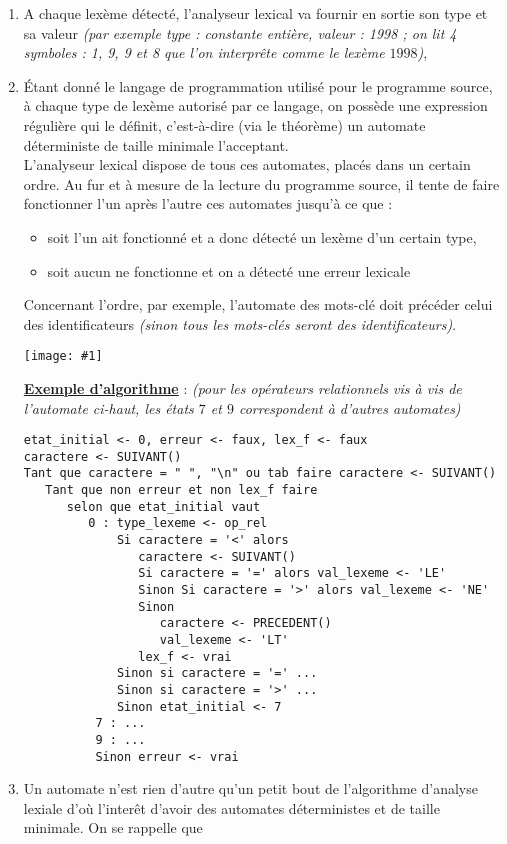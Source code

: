 \documentclass{article}
\newcommand{\imag}[1]{\begin{center}\texttt{[image: \#1]}\end{center}}
\newcommand{\stitre}[1]{\noindent\textbf{\underline{#1}}}
\begin{document}
\begin{enumerate}
\item A chaque lexème détecté, l'analyseur lexical va fournir en sortie son type et sa valeur \textit{(par exemple type : constante entière, valeur : 1998 ; on lit 4 symboles : 1, 9, 9
et 8 que l'on interprête comme le lexème $1998$)},
\item Étant donné le langage de programmation utilisé pour le programme source, à chaque type de lexème autorisé par ce langage, on possède une expression régulière qui le 
définit, c'est-à-dire (via le théorème) un automate déterministe de taille minimale l'acceptant. \\
L'analyseur lexical dispose de tous ces automates, placés dans un certain ordre. Au fur et à mesure de la lecture du programme source, il tente de faire fonctionner l'un 
après l'autre ces automates jusqu'à ce que : 
\begin{itemize}
\item soit l'un ait fonctionné et a donc détecté un lexème d'un certain type,
\item soit aucun ne fonctionne et on a détecté  une erreur lexicale
\end{itemize}
Concernant l'ordre, par exemple, l'automate des mots-clé doit précéder celui des identificateurs \textit{(sinon tous les mots-clés seront des identificateurs)}. \\
\imag{comp3.png}
\newpage
\stitre{Exemple d'algorithme} : \textit{(pour les opérateurs relationnels vis à vis de l'automate ci-haut, les états $7$ et $9$ correspondent à d'autres automates)}
\begin{verbatim}
etat_initial <- 0, erreur <- faux, lex_f <- faux
caractere <- SUIVANT()
Tant que caractere = " ", "\n" ou tab faire caractere <- SUIVANT()
   Tant que non erreur et non lex_f faire
      selon que etat_initial vaut
         0 : type_lexeme <- op_rel
             Si caractere = '<' alors
                caractere <- SUIVANT()
                Si caractere = '=' alors val_lexeme <- 'LE'
                Sinon Si caractere = '>' alors val_lexeme <- 'NE'
                Sinon
                   caractere <- PRECEDENT()
                   val_lexeme <- 'LT'
                lex_f <- vrai
             Sinon si caractere = '=' ...
             Sinon si caractere = '>' ...             
             Sinon etat_initial <- 7
          7 : ...
          9 : ...
          Sinon erreur <- vrai
\end{verbatim}
\item Un automate n'est rien d'autre qu'un petit bout de l'algorithme d'analyse lexiale d'où l'interêt d'avoir des automates déterministes et de taille minimale. On se rappelle que 

\end{enumerate}
\end{document}
